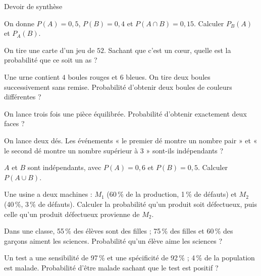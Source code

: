 \begin{exercice}[3]{Devoir de synthèse}
\begin{questions}
  \item On donne $P(A)=0{,}5$, $P(B)=0{,}4$ et $P(A\cap B)=0{,}15$. Calculer $P_B(A)$ et $P_A(B)$.
  \item On tire une carte d'un jeu de $52$. Sachant que c'est un cœur, quelle est la probabilité que ce soit un as ?
  \item Une urne contient $4$ boules rouges et $6$ bleues. On tire deux boules successivement sans remise. Probabilité d'obtenir
    deux boules de couleurs différentes ?
  \item On lance trois fois une pièce équilibrée. Probabilité d'obtenir exactement deux faces ?
  \item On lance deux dés. Les événements « le premier dé montre un nombre pair » et « le second dé montre un nombre supérieur
    à $3$ » sont-ils indépendants ?
  \item $A$ et $B$ sont indépendants, avec $P(A)=0{,}6$ et $P(B)=0{,}5$. Calculer $P(A\cup B)$.
  \item Une usine a deux machines : $M_1$ (60\,\% de la production, 1\,\% de défauts) et $M_2$ (40\,\%, 3\,\% de défauts). Calculer
    la probabilité qu'un produit soit défectueux, puis celle qu'un produit défectueux provienne de $M_2$.
  \item Dans une classe, 55\,\% des élèves sont des filles ; 75\,\% des filles et 60\,\% des garçons aiment les sciences.
    Probabilité qu'un élève aime les sciences ?
  \item Un test a une sensibilité de 97\,\% et une spécificité de 92\,\% ; 4\,\% de la population est malade. Probabilité d'être
    malade sachant que le test est positif ?
\end{questions}
\end{exercice}

